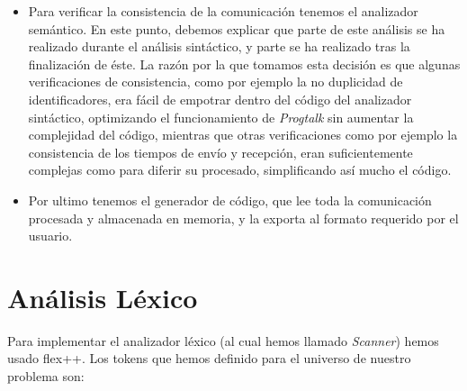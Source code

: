 \begin{itemize}
\item Para verificar la consistencia de la comunicación tenemos el
  analizador semántico. En este punto, debemos explicar que parte de
  este análisis se ha realizado durante el análisis sintáctico, y
  parte se ha realizado tras la finalización de éste. La razón por la
  que tomamos esta decisión es que algunas verificaciones de
  consistencia, como por ejemplo la no duplicidad de identificadores,
  era fácil de empotrar dentro del código del analizador sintáctico,
  optimizando el funcionamiento de \textit{Progtalk} sin aumentar la
  complejidad del código, mientras que otras verificaciones como por
  ejemplo la consistencia de los tiempos de envío y recepción, eran
  suficientemente complejas como para diferir su procesado,
  simplificando así mucho el código.
\item Por ultimo tenemos el generador de código, que lee toda la
  comunicación procesada y almacenada en memoria, y la exporta al
  formato requerido por el usuario.
\end{itemize}

\section{Análisis Léxico}
Para implementar el analizador léxico (al cual hemos llamado
\textit{Scanner}) hemos usado flex++. Los tokens que hemos definido
para el universo de nuestro problema son:

\lstset{language=C,style=code}

